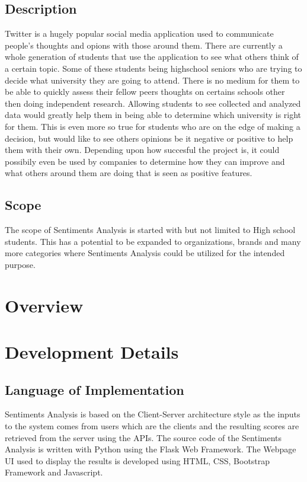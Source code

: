 \documentclass[12pt, titlepage]{article}
\begin{document}
\subsection{Description}
Twitter is a hugely popular social media application used to communicate people's thoughts
and opions with those around them. There are currently a whole generation of students that
use the application to see what others think of a certain topic. Some of these students being
highschool seniors who are trying to decide what university they are going to attend. There
is no medium for them to be able to quickly assess their fellow peers thoughts on certains
schools other then doing independent research.
Allowing students to see collected and analyzed data would greatly help them in being able
to determine which university is right for them. This is even more so true for students who
are on the edge of making a decision, but would like to see others opinions be it negative or
positive to help them with their own. Depending upon how succesful the project is, it could
possibily even be used by companies to determine how they can improve and what others
around them are doing that is seen as positive features.

\subsection{Scope}
The scope of Sentiments Analysis is started with but not limited to High school students. This has a potential to be expanded to organizations, brands and many more categories where Sentiments Analysis could be utilized for the intended purpose.

\newpage
\section{Overview}

\section{Development Details}
\subsection{Language of Implementation}
Sentiments Analysis is based on the Client-Server architecture style as the inputs to the system comes from users which are the clients and the resulting scores are retrieved from the server using the APIs. The source code of the Sentiments Analysis is written with Python using the Flask Web Framework. The Webpage UI used to display the results is developed using HTML, CSS, Bootstrap Framework and Javascript.
\end{document}
